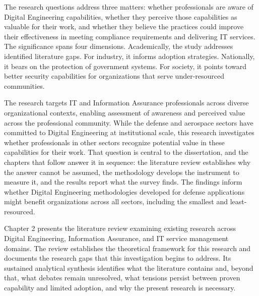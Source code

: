 The research questions address three matters: whether professionals are aware of Digital Engineering capabilities, whether they perceive those capabilities as valuable for their work, and whether they believe the practices could improve their effectiveness in meeting compliance requirements and delivering IT services. The significance spans four dimensions. Academically, the study addresses identified literature gaps. For industry, it informs adoption strategies. Nationally, it bears on the protection of government systems. For society, it points toward better security capabilities for organizations that serve under-resourced communities.

The research targets IT and Information Assurance professionals across diverse organizational contexts, enabling assessment of awareness and perceived value across the professional community. While the defense and aerospace sectors have committed to Digital Engineering at institutional scale, this research investigates whether professionals in other sectors recognize potential value in these capabilities for their work. That question is central to the dissertation, and the chapters that follow answer it in sequence: the literature review establishes why the answer cannot be assumed, the methodology develops the instrument to measure it, and the results report what the survey finds. The findings inform whether Digital Engineering methodologies developed for defense applications might benefit organizations across all sectors, including the smallest and least-resourced.

Chapter 2 presents the literature review examining existing research across Digital Engineering, Information Assurance, and IT service management domains. The review establishes the theoretical framework for this research and documents the research gaps that this investigation begins to address. Its sustained analytical synthesis identifies what the literature contains and, beyond that, what debates remain unresolved, what tensions persist between proven capability and limited adoption, and why the present research is necessary.